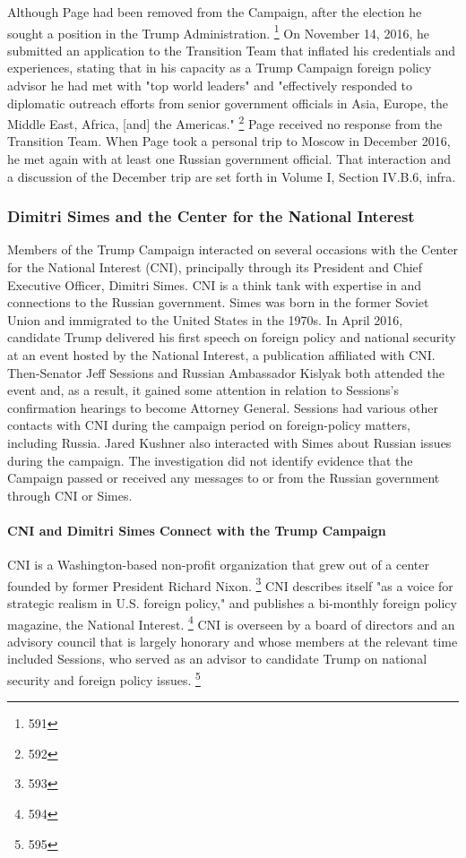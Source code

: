 Although Page had been removed from the Campaign, after the election he sought a position in the Trump Administration.%
\footnote{591}
On November 14, 2016, he submitted an application to the Transition Team that inflated his credentials and experiences, stating that in his capacity as a Trump Campaign foreign policy advisor he had met with "top world leaders" and "effectively responded to diplomatic outreach efforts from senior government officials in Asia, Europe, the Middle East, Africa, [and] the Americas."%
\footnote{592}
Page received no response from the Transition Team.
When Page took a personal trip to Moscow in December 2016, he met again with at least one Russian government official.
That interaction and a discussion of the December trip are set forth in Volume I, Section IV.B.6, infra.

\subsubsection{Dimitri Simes and the Center for the National Interest}

Members of the Trump Campaign interacted on several occasions with the Center for the National Interest (CNI), principally through its President and Chief Executive Officer, Dimitri Simes.
CNI is a think tank with expertise in and connections to the Russian government.
Simes was born in the former Soviet Union and immigrated to the United States in the 1970s.
In April 2016, candidate Trump delivered his first speech on foreign policy and national security at an event hosted by the National Interest, a publication affiliated with CNI.
Then-Senator Jeff Sessions and Russian Ambassador Kislyak both attended the event and, as a result, it gained some attention in relation to Sessions's confirmation hearings to become Attorney General.
Sessions had various other contacts with CNI during the campaign period on foreign-policy matters, including Russia.
Jared Kushner also interacted with Simes about Russian issues during the campaign.
The investigation did not identify evidence that the Campaign passed or received any messages to or from the Russian government through CNI or Simes.

\paragraph{CNI and Dimitri Simes Connect with the Trump Campaign}

CNI is a Washington-based non-profit organization that grew out of a center founded by former President Richard Nixon.%
\footnote{593}
CNI describes itself "as a voice for strategic realism in U.S. foreign policy," and publishes a bi-monthly foreign policy magazine, the National Interest.%
\footnote{594}
CNI is overseen by a board of directors and an advisory council that is largely honorary and whose members at the relevant time included Sessions, who served as an advisor to candidate Trump on national security and foreign policy issues.%
\footnote{595}


